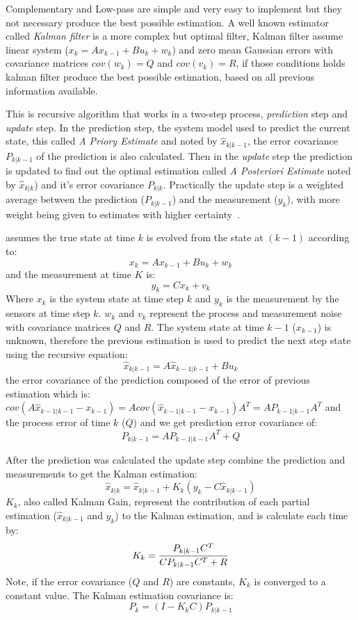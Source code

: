\documentclass[ twoside, 12pt ]{article}
\begin{document}
Complementary and Low-pass are simple and very easy to implement but they not necessary produce the best possible estimation.
A well known estimator called \textit{Kalman filter} is a more complex but optimal filter, Kalman filter assume linear system ($x_{k}=Ax_{k-1} + Bu_{k} + w_{k}$) and zero mean Gaussian errors with covariance matrices $cov(w_k)=Q$ and $cov(v_k)=R$, if those conditions holds kalman filter produce the best possible estimation, based on all previous information available.

This is recursive algorithm that works in a two-step process, \textit{prediction} step and \textit{update} step. 
In the prediction step, the system model used to predict the current state, this called \textit{A Priory Estimate} and noted by $\hat{x}_{k|k-1}$,
the error covariance $P_{k|k-1}$ of the prediction is also calculated.
Then in the \textit{update} step the prediction is updated to find out the optimal estimation called \textit{A Posteriori Estimate} noted by $\hat{x}_{k|k}$) and it's error covariance $P_{k|k}$.
Practically the update step is a weighted average between the prediction ($P_{k|k-1}$) and the measurement ($y_k$), with more weight being given to estimates with higher certainty~\cite{Kalman-filter}. 

assumes the true state at time $k$ is evolved from the state at $(k-1)$ according to:
$$x_{k}=Ax_{k-1} + Bu_{k} + w_{k}$$
and the measurement at time $K$ is:
$$y_k=Cx_k+v_k$$
Where $x_k$ is the system state at time step $k$ and $y_k$ is the measurement by the sensors at time step $k$.
$w_k$ and $v_k$ represent the process and measurement noise with covariance matrices $Q$ and $R$.
The system state at time $k-1$ ($x_{k-1}$) is unknown, therefore the previous estimation is used to predict the next step state using the recursive equation:
$$ \hat{x}_{k|k-1}=A\hat{x}_{k-1|k-1} + Bu_{k} $$
the error covariance of the prediction composed of the error of previous estimation which is:
$cov(A\hat{x}_{k-1|k-1} - x_{k-1}) = A cov(\hat{x}_{k-1|k-1} - x_{k-1}) A^T=A P_{k-1|k-1} A^T$
and the process error of time $k$ ($Q$) and we get prediction error covariance of:
$$ P_{k|k-1} = A P_{k-1|k-1} A^T + Q $$

After the prediction was calculated the update step combine the prediction and measurements to get the Kalman estimation:
$$ \hat{x}_{k|k} = \hat{x}_{k|k-1} + K_k(y_k - C\hat{x}_{k|k-1})$$
$K_k$, also called Kalman Gain, represent the contribution of each partial estimation ($\hat{x}_{k|k-1}$ and $y_k$) to the Kalman estimation, and is calculate each time by:
$$ K_k = {{P_{k|k-1} C^T} \over {C P_{k|k-1} C^T + R} }$$
Note, if the error covariance ($Q$ and $R$) are constants, $K_k$ is converged to a constant value.
The Kalman estimation covariance is:
$$ P_k = (I - K_kC) P_{k|k-1} $$
\end{document}
